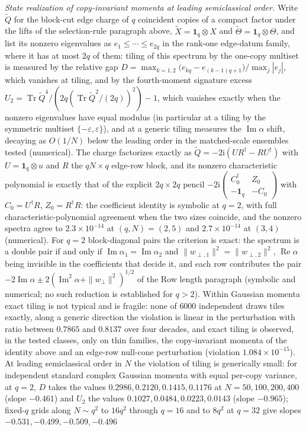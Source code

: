 \emph{State realization of copy-invariant momenta at leading semiclassical order.} Write \(\widetilde Q\) for the block-cut edge charge of \(q\) coincident copies of a compact factor under the lifts of the selection-rule paragraph above, \(\widetilde X=\mathbf 1_q\otimes X\) and \(\widetilde\Theta=\mathbf 1_q\otimes\Theta\), and list its nonzero eigenvalues as \(e_1\le\cdots\le e_{2q}\) in the rank-one edge-datum family, where it has at most \(2q\) of them: tiling of this spectrum by the one-copy multiset is measured by the relative gap \(D=\max_{k=1,2}\bigl(e_{kq}-e_{(k-1)q+1}\bigr)/\max_j|e_j|\), which vanishes at tiling, and by the fourth-moment signature excess \(U_2=\operatorname{Tr}\widetilde Q^{4}/(2q(\operatorname{Tr}\widetilde Q^{2}/(2q))^{2})-1\), which vanishes exactly when the nonzero eigenvalues have equal modulus (in particular at a tiling by the symmetric multiset \(\{-\varepsilon,\varepsilon\}\)), and at a generic tiling measures the \(\operatorname{Im}\alpha\) shift, decaying as \(O(1/N)\) below the leading order in the matched-scale ensembles tested (numerical). The charge factorizes exactly as \(\widetilde Q=-2\mathrm i(UR^\dagger-RU^\dagger)\) with \(U=\mathbf 1_q\otimes u\) and \(R\) the \(qN\times q\) edge-row block, and its nonzero characteristic polynomial is exactly that of the explicit \(2q\times2q\) pencil \(-2\mathrm i\left(\begin{smallmatrix}C_0^\dagger&Z_0\\-\mathbf 1_q&-C_0\end{smallmatrix}\right)\) with \(C_0=U^\dagger R\), \(Z_0=R^\dagger R\): the coefficient identity is symbolic at \(q=2\), with full characteristic-polynomial agreement when the two sizes coincide, and the nonzero spectra agree to \(2.3\times10^{-14}\) at \((q,N)=(2,5)\) and \(2.7\times10^{-14}\) at \((3,4)\) (numerical). For \(q=2\) block-diagonal pairs the criterion is exact: the spectrum is a double pair if and only if \(\operatorname{Im}\alpha_1=\operatorname{Im}\alpha_2\) and \(\|w_{\perp,1}\|^{2}=\|w_{\perp,2}\|^{2}\), \(\operatorname{Re}\alpha\) being invisible in the coefficients that decide it, and each row contributes the pair \(-2\operatorname{Im}\alpha\pm2(\operatorname{Im}^{2}\alpha+\|w_\perp\|^{2})^{1/2}\) of the Row length paragraph (symbolic and numerical; no such reduction is established for \(q>2\)). Within Gaussian momenta exact tiling is not typical and is fragile: none of \(6000\) independent draws tiles exactly, along a generic direction the violation is linear in the perturbation with ratio between \(0.7865\) and \(0.8137\) over four decades, and exact tiling is observed, in the tested classes, only on thin families, the copy-invariant momenta of the identity above and an edge-row null-cone perturbation (violation \(1.084\times10^{-15}\)). At leading semiclassical order in \(N\) the violation of tiling is generically small: for independent standard complex Gaussian momenta with equal per-copy variance, at \(q=2\), \(D\) takes the values \(0.2986,0.2120,0.1415,0.1176\) at \(N=50,100,200,400\) (slope \(-0.461\)) and \(U_2\) the values \(0.1027,0.0484,0.0223,0.0143\) (slope \(-0.965\)); fixed-\(q\) grids along \(N\sim q^{2}\) to \(16q^{2}\) through \(q=16\) and to \(8q^{2}\) at \(q=32\) give slopes \(-0.531,-0.499,-0.509,-0.496\) 
